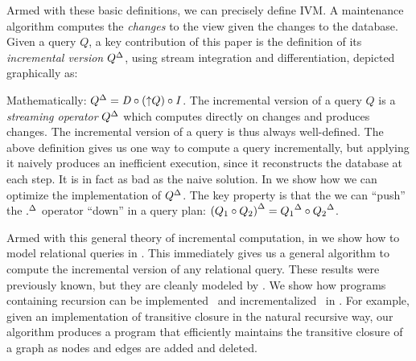 Armed with these basic definitions, we can precisely define IVM.  A
maintenance algorithm computes the \emph{changes} to the view given
the changes to the database. Given a query $Q$, a key contribution of
this paper is the definition of its \emph{incremental version}
${Q}^{\Delta}$, using stream integration and differentiation, depicted
graphically as:

%
\begin{center}
\end{center}

%
Mathematically: ${Q}^{\Delta} = \mathit{D} \circ ({\uparrow}Q) \circ \mathit{I}$.  The
incremental version of a query $Q$ is a \emph{streaming operator}
${Q}^{\Delta}$ which computes directly on changes and produces changes.
The incremental version of a query is thus always well-defined.  The
above definition gives us one way to compute a query incrementally,
but applying it naively produces an inefficient execution, since it
reconstructs the database at each step.  It is in fact as bad as the
naive solution.  In  we show how we can
optimize the implementation of ${Q}^{\Delta}$. The key property is that the
we can ``push'' the ${.}^{\Delta}$ operator ``down'' in a query plan:
${(Q_1 \circ Q_2)}^{\Delta} = {Q_1}^{\Delta} \circ {Q_2}^{\Delta}$.

Armed with this general theory of incremental computation, in
 we show how to model relational queries in
\dbsp.  This immediately gives us a general algorithm to compute the
incremental version of any relational query.  These results were
previously known, but they are cleanly modeled by \dbsp.  We show how
programs containing recursion can be
implemented~ and
incrementalized~ in \dbsp.  For example, given an
implementation of transitive closure in the natural recursive way, our
algorithm produces a program that efficiently maintains the transitive
closure of a graph as nodes and edges are added and deleted.

